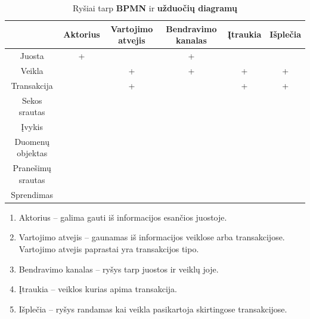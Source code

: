 \documentclass{VUMIFInfBakalaurinis}
\begin{document}
\begin{center}
    \begin{longtable}{ | c | c |  c | c | c | c |}
    \caption{Ryšiai tarp \textbf{BPMN} ir \textbf{užduočių diagramų}}
	\label{tab:relations_sd_bpmn}
    \\ \hline 
     & 
     Aktorius 
     & 
     Vartojimo atvejis 
     & 
     Bendravimo kanalas 
     & 
     Įtraukia 
     & 
     Išplečia 
     \\ 
    \hline 
    Juosta & + & & + &  &  \\
    \hline
    Veikla  & & + & + & + & + \\
    \hline
    Transakcija & & + & & + & + \\
    \hline
    Sekos srautas  & &  & & & \\
    \hline
    Įvykis  & & & & & \\
    \hline 
    Duomenų objektas  & & & & & \\
    \hline
    Pranešimų srautas  & & & & & \\
    \hline
    Sprendimas  & & & & & \\
    \hline
    \end{longtable}
\end{center} 

\begin{enumerate}
	\item Aktorius – galima gauti iš informacijos esančios juostoje. 
	\item Vartojimo atvejis – gaunamas iš informacijos veiklose arba transakcijose. Vartojimo atvejis paprastai yra transakcijos tipo.
	\item Bendravimo kanalas – ryšys tarp juostos ir veiklų joje.
	\item Įtraukia – veiklos kurias apima transakcija.
	\item Išplečia – ryšys randamas kai veikla pasikartoja skirtingose transakcijose.
\end{enumerate} 
\end{document}
